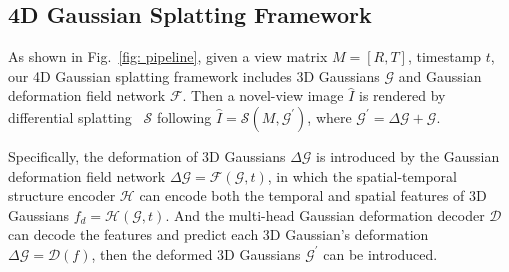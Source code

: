 \documentclass[10pt,twocolumn,letterpaper]{article}
\begin{document}
\subsection{4D Gaussian Splatting Framework}
\label{subsec:4dgs}

As shown in Fig.~\ref{fig: pipeline}, given a view matrix $M=[R, T]$, timestamp $t$, our 4D Gaussian splatting framework includes 3D Gaussians $\mathcal{G}$ and Gaussian deformation field network $\mathcal{F}$. Then a novel-view image $\hat{I}$ is rendered by differential splatting~\cite{yifan2019differentiablesplatting} $\mathcal{S}$ following $\hat{I} = \mathcal{S}(M,\mathcal{G}^\prime)$, where $\mathcal{G}^\prime=\Delta\mathcal{G}+\mathcal{G}$.

Specifically, the deformation of 3D Gaussians $\Delta \mathcal{G}$ is introduced by the Gaussian deformation field network $\Delta \mathcal{G} = \mathcal{F}(\mathcal{G}, t)$, in which the spatial-temporal structure encoder $\mathcal{H}$ can encode both the temporal and spatial features of 3D Gaussians $f_d=\mathcal{H}(\mathcal{G}, t)$. And the multi-head Gaussian deformation decoder $\mathcal{D}$ can decode the features and predict each 3D Gaussian's deformation $\Delta \mathcal{G} = \mathcal{D}(f)$, then the deformed 3D Gaussians $\mathcal{G}^\prime$ can be introduced.

\end{document}

